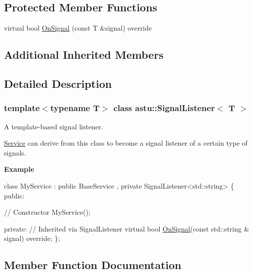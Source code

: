 \subsection*{Protected Member Functions}
\begin{DoxyCompactItemize}
\item 
virtual bool \hyperlink{classastu_1_1SignalListener_afe6b444f1413f98e6ae4982b72a43b5d}{On\+Signal} (const T \&signal) override
\end{DoxyCompactItemize}
\subsection*{Additional Inherited Members}


\subsection{Detailed Description}
\subsubsection*{template$<$typename T$>$\newline
class astu\+::\+Signal\+Listener$<$ T $>$}

A template-\/based signal listener.

\hyperlink{classastu_1_1Service}{Service} can derive from this class to become a signal listener of a certain type of signals.

{\bfseries Example}


\begin{DoxyCode}
\textcolor{keyword}{class }MyService
  : \textcolor{keyword}{public} BaseService
  , \textcolor{keyword}{private} SignalListener<std::string>
\{
\textcolor{keyword}{public}:

  \textcolor{comment}{// Constructor}
  MyService();

\textcolor{keyword}{private}:
  \textcolor{comment}{// Inherited via SignalListener}
  \textcolor{keyword}{virtual} \textcolor{keywordtype}{bool} \hyperlink{classastu_1_1SignalListener_afe6b444f1413f98e6ae4982b72a43b5d}{OnSignal}(\textcolor{keyword}{const} std::string & signal) \textcolor{keyword}{override};         
\};
\end{DoxyCode}
 

\subsection{Member Function Documentation}
\mbox{\label{classastu_1_1SignalListener_afe6b444f1413f98e6ae4982b72a43b5d}} 
